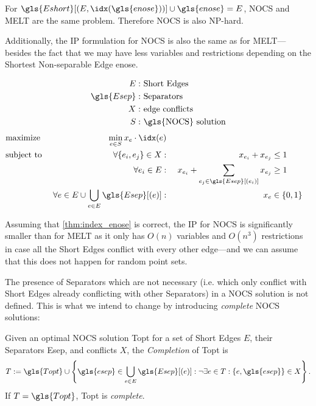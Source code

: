 \begin{theorem}
  For \(\gls{Eshort}[(E,\idx(\gls{enose}))] \cup \gls{enose} = E\),
  \gls{NOCS} and \gls{MELT} are the same problem.
  Therefore \gls{NOCS} is also NP-hard.
\end{theorem}

Additionally, the \gls{IP} formulation for \gls{NOCS} is also the same
as for \gls{MELT}---besides the fact that we may have less variables
and restrictions depending on the
Shortest Non-separable Edge \gls{enose}.

\begin{problem}
  \hfill
  \begin{alignat*}{1}
    E: &~ \text{Short Edges} \\
    \gls{Esep}: &~ \text{Separators} \\
    X: &~ \text{edge conflicts} \\
    S: &~ \text{\gls{NOCS} solution}
  \end{alignat*}
  \begin{alignat*}{3}
    &\text{maximize } & \min\limits_{e \in S} x_e \cdot \idx(e) \\
    &\text{subject to } & \forall \{e_i,e_j\} \in X : &~& x_{e_i} + x_{e_j} &\leq 1 \\
    && \forall e_i \in E : &~
      & x_{e_i} + \sum\limits_{e_j \in \gls{Esep}[(e_i)]} x_{e_j} &\geq 1 \\
    && \forall e \in E
      \cup \bigcup\limits_{e \in E} \gls{Esep}[(e)] :
      &~& x_e &\in \{0,1\}
  \end{alignat*}
\end{problem}

Assuming that \cref{thm:index_enose} is correct, the \gls{IP} for
\gls{NOCS} is significantly smaller than for \gls{MELT} as it only has
\(O(n)\) variables and \(O(n^3)\) restrictions in case all the 
Short Edges conflict with every other edge---and
we can assume that this does not happen for random point sets.

The presence of Separators which are not necessary (i.e. which only
conflict with Short Edges already conflicting with other
Separators) in a \gls{NOCS} solution is not defined. This is what
we intend to change by introducing
\emph{complete} \gls{NOCS} solutions:

\begin{definition}
  Given an optimal \gls{NOCS} solution \gls{Topt}
  for a set of Short Edges \(E\), their Separators \gls{Esep},
  and conflicts \(X\), the \emph{Completion} of \gls{Topt} is
  \[
    T := \gls{Topt} \cup \left\{
      \gls{esep} \in \bigcup\limits_{e \in E} \gls{Esep}[(e)]:
      \lnot\exists e \in T : \{e, \gls{esep}\} \in X
    \right\}.
  \]
  If \(T = \gls{Topt}\), \gls{Topt} is \emph{complete}.
\end{definition}

